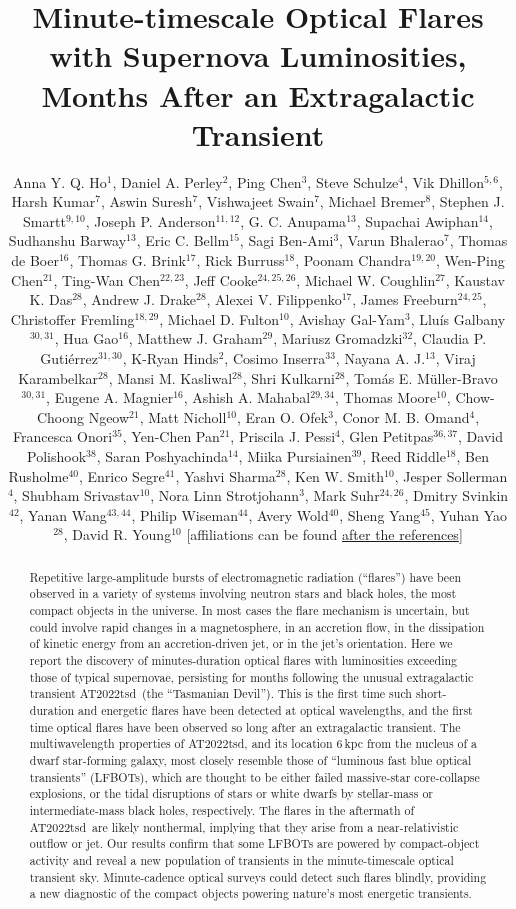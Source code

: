 \documentclass{nature_plusfigure}
\title{Minute-timescale Optical Flares with Supernova Luminosities, Months After an Extragalactic Transient}
\author{Anna Y. Q. Ho$^{1}$, Daniel A. Perley$^{2}$, Ping Chen$^{3}$, Steve Schulze$^{4}$, Vik Dhillon$^{5,6}$, Harsh Kumar$^{7}$, Aswin Suresh$^{7}$, Vishwajeet Swain$^{7}$, Michael Bremer$^{8}$, Stephen J. Smartt$^{9,10}$, Joseph P. Anderson$^{11,12}$, G. C. Anupama$^{13}$, Supachai Awiphan$^{14}$, Sudhanshu Barway$^{13}$, Eric C. Bellm$^{15}$, Sagi Ben-Ami$^{3}$, Varun Bhalerao$^{7}$, Thomas de Boer$^{16}$, Thomas G. Brink$^{17}$, Rick Burruss$^{18}$, Poonam Chandra$^{19,20}$, Wen-Ping Chen$^{21}$, Ting-Wan Chen$^{22,23}$, Jeff Cooke$^{24,25,26}$, Michael W. Coughlin$^{27}$, Kaustav K. Das$^{28}$, Andrew J. Drake$^{28}$, Alexei V. Filippenko$^{17}$, James Freeburn$^{24,25}$, Christoffer Fremling$^{18,29}$, Michael D. Fulton$^{10}$, Avishay Gal-Yam$^{3}$, Llu\'is Galbany$^{30,31}$, Hua Gao$^{16}$, Matthew J. Graham$^{29}$, Mariusz Gromadzki$^{32}$, Claudia P. Guti\'errez$^{31,30}$, K-Ryan Hinds$^{2}$, Cosimo Inserra$^{33}$, Nayana A. J.$^{13}$, Viraj Karambelkar$^{28}$, Mansi M. Kasliwal$^{28}$, Shri Kulkarni$^{28}$, Tom\'as E. M\"uller-Bravo$^{30,31}$, Eugene A. Magnier$^{16}$, Ashish A. Mahabal$^{29,34}$, Thomas Moore$^{10}$, Chow-Choong Ngeow$^{21}$, Matt Nicholl$^{10}$, Eran O. Ofek$^{3}$, Conor M. B. Omand$^{4}$, Francesca Onori$^{35}$, Yen-Chen Pan$^{21}$, Priscila J. Pessi$^{4}$, Glen Petitpas$^{36,37}$, David Polishook$^{38}$, Saran Poshyachinda$^{14}$, Miika Pursiainen$^{39}$, Reed Riddle$^{18}$, Ben Rusholme$^{40}$, Enrico Segre$^{41}$, Yashvi Sharma$^{28}$, Ken W. Smith$^{10}$, Jesper Sollerman$^{4}$, Shubham Srivastav$^{10}$, Nora Linn Strotjohann$^{3}$, Mark Suhr$^{24,26}$, Dmitry Svinkin$^{42}$, Yanan Wang$^{43,44}$, Philip Wiseman$^{44}$, Avery Wold$^{40}$, Sheng Yang$^{45}$, Yuhan Yao$^{28}$, David R. Young$^{10}$
[affiliations can be found \hyperref[sec:affiliations]{after the references}]
	}
\newcommand{\at}{AT2022tsd}
\begin{document}
\maketitle

\begin{abstract}

Repetitive large-amplitude bursts of electromagnetic radiation (``flares'') have been observed in a variety of systems involving neutron stars and black holes\cite{Fender1997,Hurley1999,Marrone2008,Racusin2008,Kasliwal2008,CastroTirado2008,Stefanescu2008,Nesci2021}, the most compact objects in the universe. In most cases the flare mechanism is uncertain, but could involve rapid changes in a magnetosphere\cite{Hurley1999,CastroTirado2008,Stefanescu2008}, in an accretion flow\cite{Fender2004,Yuan2014}, in the dissipation of kinetic energy from an accretion-driven jet\cite{Racusin2008}, or in the jet's orientation\cite{Raiteri2017}.
Here we report the discovery of minutes-duration optical flares with luminosities exceeding those of typical supernovae, persisting for months following the unusual extragalactic transient \at\ (the ``Tasmanian Devil'').
This is the first time such short-duration and energetic flares have been detected at optical wavelengths, and the first time optical flares have been observed so long after an extragalactic transient.
The multiwavelength properties of \at, and its location 6\,kpc from the nucleus of a dwarf star-forming galaxy, most closely resemble those of ``luminous fast blue optical transients'' (LFBOTs\cite{Greiner2015,Prentice2018,RiveraSandoval2018,Perley2019,Margutti2019,Ho2019,Coppejans2020,Ho2020_Koala,Perley2021,Bright2022,Ho2022_AT2020xnd,Yao2022}), which are thought to be either failed massive-star core-collapse explosions\cite{Prentice2018,Margutti2019,Perley2019}, or the tidal disruptions of stars\cite{Metzger2022} or white dwarfs\cite{Kuin2019,Perley2019} by stellar-mass or intermediate-mass black holes, respectively. The flares in the aftermath of \at\ are likely nonthermal, implying that they arise from a near-relativistic outflow or jet. %
Our results confirm that some LFBOTs are powered by compact-object activity
and reveal a new population of transients in the minute-timescale optical transient sky.
Minute-cadence optical surveys\cite{Ofek2023,Law2022} could detect such flares blindly,
providing a new diagnostic of the compact objects powering nature's most energetic transients.

\end{abstract}
\end{document}
